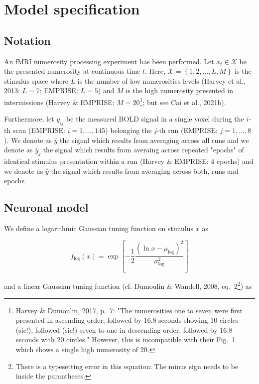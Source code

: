 \documentclass[a4paper,12pt]{article}
\begin{document}
\section{Model specification} \label{sec:Mod}

\subsection{Notation} \label{sec:Not}

An fMRI numerosity processing experiment has been performed. Let $x_t \in \mathcal{X}$ be the presented numerosity at continuous time $t$. Here, $\mathcal{X} = \left\lbrace 1, 2, \ldots, L, M \right\rbrace$ is the stimulus space where $L$ is the number of low numerosities levels (Harvey et al., 2013: $L = 7$; EMPRISE: $L = 5$) and $M$ is the high numerosity presented in intermissions (Harvey \& EMPRISE: $M = 20$\footnote{Harvey \& Dumoulin, 2017, p.~7: "The numerosities one to seven were first presented in ascending order, followed by 16.8 seconds showing 10 circles (sic!), followed (sic!) seven to one in descending order, followed by 16.8 seconds with 20 circles." However, this is incompatible with their Fig.~1 which shows a single high numerosity of 20.}; but see Cai et al., 2021b).

Furthermore, let $y_{ij}$ be the measured BOLD signal in a single voxel during the $i$-th scan (EMPRISE: $i = 1,\ldots,145$) belonging the $j$-th run (EMPRISE: $j = 1,\ldots,8$). We denote as $\bar{y}$ the signal which results from averaging across all runs and we denote as $\bar{y}_j$ the signal which results from averaing across repeated "epochs" of identical stimulus presentation within a run (Harvey \& EMPRISE: 4 epochs) and we denote as $\bar{\bar{y}}$  the signal which results from averaging across both, runs and epochs.


\subsection{Neuronal model}

We define a logarithmic Gaussian tuning function on stimulus $x$ as

\begin{equation} \label{eq:f-log}
f_\mathrm{log}(x) = \exp \left[ -\frac{1}{2} \frac{(\ln x - \mu_\mathrm{log})^2}{\sigma_\mathrm{log}^2} \right]
\end{equation}

\pagebreak
and a linear Gaussian tuning function (cf. Dumoulin \& Wandell, 2008, eq.~2\footnote{There is a typesetting error in this equation: The minus sign needs to be inside the parantheses.}) as 
\end{document}

